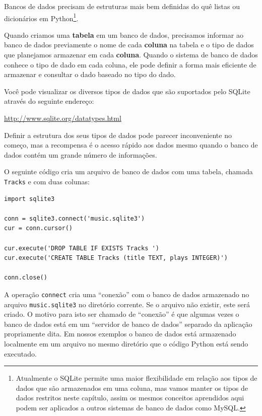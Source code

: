 Bancos de dados precisam de estruturas mais bem definidas do quê listas ou
dicionários em Python\footnote{Atualmente o SQLite permite uma maior
  flexibilidade em relação aos tipos de dados que são armazenados em uma
  coluna, mas vamos manter os tipos de dados restritos neste capítulo, assim
  os mesmos conceitos aprendidos aqui podem ser aplicados a outros sistemas
  de banco de dados como MySQL.}.

Quando criamos uma {\bf tabela} em um banco de dados, precisamos informar ao
banco de dados previamente o nome de cada {\bf coluna} na tabela e o tipo de
dados que planejamos armazenar em cada {\bf coluna}. Quando o sistema de
banco de dados conhece o tipo de dado em cada coluna, ele pode definir a
forma mais eficiente de armazenar e consultar o dado baseado no tipo do dado.

Você pode visualizar os diversos tipos de dados que são suportados pelo SQLite
através do seguinte endereço:

\url{http://www.sqlite.org/datatypes.html}

Definir a estrutura dos seus tipos de dados pode parecer inconveniente no
começo, mas a recompensa é o acesso rápido aos dados mesmo quando o banco
de dados contém um grande número de informações.

O seguinte código cria um arquivo de banco de dados com uma tabela, chamada
{\tt Tracks} e com duas colunas:

\beforeverb
\begin{verbatim}
import sqlite3

conn = sqlite3.connect('music.sqlite3')
cur = conn.cursor()

cur.execute('DROP TABLE IF EXISTS Tracks ')
cur.execute('CREATE TABLE Tracks (title TEXT, plays INTEGER)')

conn.close()
\end{verbatim}
\afterverb
%

A operação {\tt connect} cria uma ``conexão'' com o banco de dados armazenado
no arquivo {\tt music.sqlite3} no diretório corrente. Se o arquivo não
existir, este será criado. O motivo para isto ser chamado de ``conexão'' é
que algumas vezes o banco de dados está  em um ``servidor de banco de dados'' 
separado da aplicação propriamente dita. Em nossos exemplos o banco de dados
está armazenado localmente em um arquivo no mesmo diretório que o código
Python está sendo executado.

